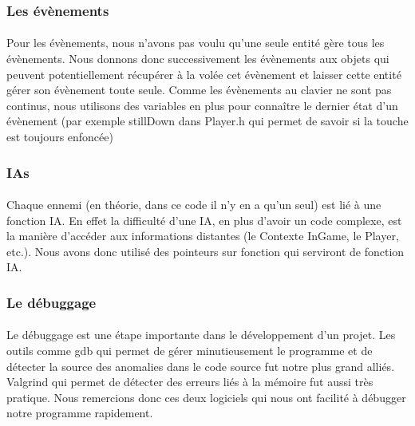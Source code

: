 \subsubsection{Les évènements}

\paragraph{} Pour les évènements, nous n'avons pas voulu qu'une seule entité gère tous les évènements. Nous donnons donc successivement les évènements aux objets qui peuvent potentiellement récupérer à la volée cet évènement et laisser cette entité gérer son évènement toute seule. Comme les évènements au clavier ne sont pas continus, nous utilisons des variables en plus pour connaître le dernier état d'un évènement (par exemple stillDown dans Player.h qui permet de savoir si la touche est toujours enfoncée)

\subsubsection{IAs}

\paragraph{} Chaque ennemi (en théorie, dans ce code il n'y en a qu'un seul) est lié à une fonction IA. En effet la difficulté d'une IA, en plus d'avoir un code complexe, est la manière d'accéder aux informations distantes (le Contexte InGame, le Player, etc.). Nous avons donc utilisé des pointeurs sur fonction qui serviront de fonction IA.

\subsubsection{Le débuggage}

\paragraph{} Le débuggage est une étape importante dans le développement d'un projet. Les outils comme gdb qui permet de gérer minutieusement le programme et de détecter la source des anomalies dans le code source fut notre plus grand alliés. Valgrind qui permet de détecter des erreurs liés à la mémoire fut aussi très pratique. Nous remercions donc ces deux logiciels qui nous ont facilité à débugger notre programme rapidement.
